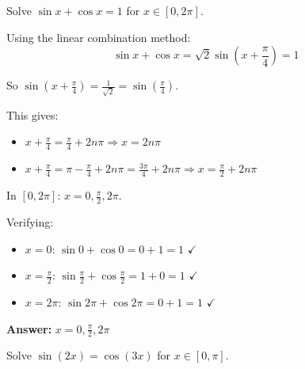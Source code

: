 \documentclass[12pt]{article}
\newenvironment{problem}[1]
{\begin{tcolorbox}[colback=blue!5!white,colframe=blue!75!black,title={#1}]}{\end{tcolorbox}}
\newenvironment{solution}
{\begin{tcolorbox}[colback=green!5!white,colframe=green!75!black,title={Solution}]}{\end{tcolorbox}}
\begin{document}
\begin{problem}{Example: Linear Combination Method}
Solve $\sin x + \cos x = 1$ for $x \in [0, 2\pi]$.
\end{problem}

\begin{solution}
Using the linear combination method:
\[\sin x + \cos x = \sqrt{2}\sin\left(x + \frac{\pi}{4}\right) = 1\]

So $\sin\left(x + \frac{\pi}{4}\right) = \frac{1}{\sqrt{2}} = \sin\left(\frac{\pi}{4}\right)$.

This gives:
\begin{itemize}
    \item $x + \frac{\pi}{4} = \frac{\pi}{4} + 2n\pi \Rightarrow x = 2n\pi$
    \item $x + \frac{\pi}{4} = \pi - \frac{\pi}{4} + 2n\pi = \frac{3\pi}{4} + 2n\pi \Rightarrow x = \frac{\pi}{2} + 2n\pi$
\end{itemize}

In $[0, 2\pi]$: $x = 0, \frac{\pi}{2}, 2\pi$.

Verifying:
\begin{itemize}
    \item $x = 0$: $\sin 0 + \cos 0 = 0 + 1 = 1$ $\checkmark$
    \item $x = \frac{\pi}{2}$: $\sin\frac{\pi}{2} + \cos\frac{\pi}{2} = 1 + 0 = 1$ $\checkmark$
    \item $x = 2\pi$: $\sin 2\pi + \cos 2\pi = 0 + 1 = 1$ $\checkmark$
\end{itemize}

\textbf{Answer:} $x = 0, \frac{\pi}{2}, 2\pi$
\end{solution}

\begin{problem}{Example: When Cofunction Doesn't Apply}
Solve $\sin(2x) = \cos(3x)$ for $x \in [0, \pi]$.
\end{problem}
\end{document}
